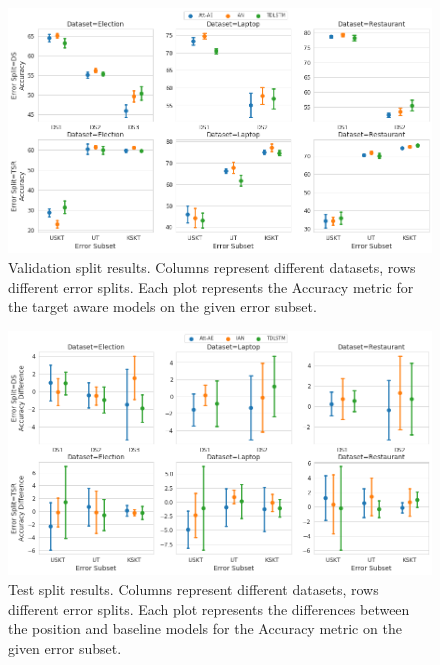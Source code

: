 \begin{figure}[!h]
    \centering
    \includegraphics[scale=0.42]{images/augmentation/methods_performance/Inter_Target/inter_target_encoding_split_overall_validation.png}
    \caption{Validation split results. Columns represent different datasets, rows different error splits. Each plot represents the Accuracy metric for the target aware models on the given error subset.}
    \label{fig:aug_inter_target_encoding_split_overall_validation}
\end{figure}

\begin{figure}[!h]
    \centering
    \includegraphics[scale=0.42]{images/augmentation/methods_performance/Inter_Target/inter_target_encoding_split_overall_diff_test.png}
    \caption{Test split results. Columns represent different datasets, rows different error splits. Each plot represents the differences between the position and baseline models for the Accuracy metric on the given error subset.}
    \label{fig:aug_inter_target_encoding_split_overall_diff_test}
\end{figure}

